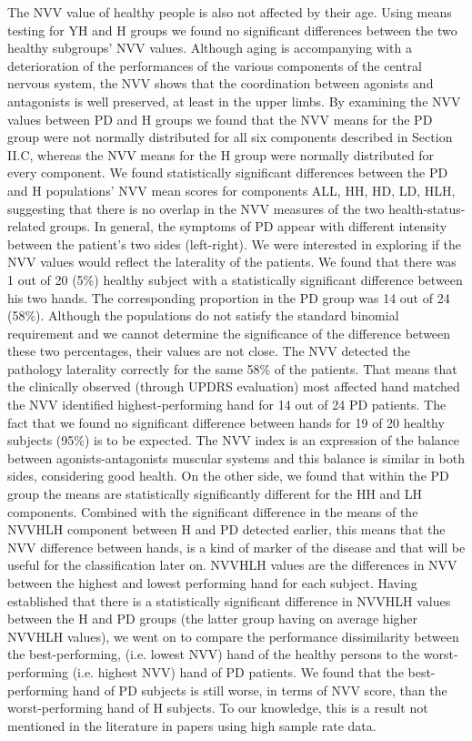 The NVV value of healthy people is also not affected by their age. Using means testing for YH and H groups we found no significant differences between the two healthy subgroups’ NVV values. Although aging is accompanying with a deterioration of the performances of the various components of the central nervous system, the NVV shows that the coordination between agonists and antagonists is well preserved, at least in the upper limbs.
By examining the NVV values between PD and H groups we found that the NVV means for the PD group were not normally distributed for all six components described in Section II.C, whereas the NVV means for the H group were normally distributed for every component. 
We found statistically significant differences between the PD and H populations’ NVV mean scores for components ALL, HH, HD, LD, HLH, suggesting that there is no overlap in the NVV measures of the two health-status-related groups. 
In general, the symptoms of PD appear with different intensity between the patient’s two sides (left-right). We were interested in exploring if the NVV values would reflect the laterality of the patients. 
We found that there was 1 out of 20 (5\%) healthy subject with a statistically significant difference between his two hands. The corresponding proportion in the PD group was 14 out of 24 (58\%). Although the populations do not satisfy the standard binomial requirement and we cannot determine the significance of the difference between these two percentages, their values are not close. The NVV detected the pathology laterality correctly for the same 58\% of the patients. That means that the clinically observed (through UPDRS evaluation) most affected hand matched the NVV identified highest-performing hand for 14 out of 24 PD patients.
The fact that we found no significant difference between hands for 19 of 20 healthy subjects (95\%) is to be expected. The NVV index is an expression of the balance between agonists-antagonists muscular systems and this balance is similar in both sides, considering good health. On the other side, we found that within the PD group the means are statistically significantly different for the HH and LH components. Combined with the significant difference in the means of the NVVHLH component between H and PD detected earlier, this means that the NVV difference between hands, is a kind of marker of the disease and that will be useful for the classification later on. 
NVVHLH values are the differences in NVV between the highest and lowest performing hand for each subject. Having established that there is a statistically significant difference in NVVHLH values between the H and PD groups (the latter group having on average higher NVVHLH values), we went on to compare the performance dissimilarity between the best-performing, (i.e. lowest NVV) hand of the healthy persons to the worst-performing (i.e. highest NVV) hand of PD patients. We found that the best-performing hand of PD subjects is still worse, in terms of NVV score, than the worst-performing hand of H subjects. To our knowledge, this is a result not mentioned in the literature in papers using high sample rate data. 
